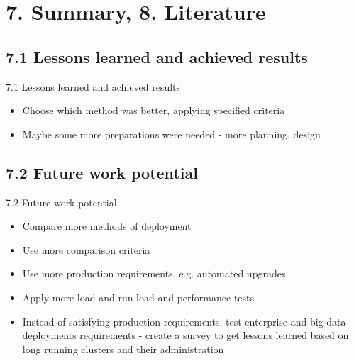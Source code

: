 \documentclass{beamer}
\begin{document}
\section{7. Summary, 8. Literature}
\subsection{7.1 Lessons learned and achieved results}
\begin{frame}{7.1 Lessons learned and achieved results}%
\begin{itemize}
	\item Choose which method was better, applying specified criteria 
	\item Maybe some more preparations were needed - more planning, design
\end{itemize}
\end{frame}
\subsection{7.2 Future work potential}
\begin{frame}{7.2 Future work potential}%
\begin{itemize}
	\item Compare more methods of deployment
	\item Use more comparison criteria 
	\item Use more production requirements, e.g. automated upgrades
	\item Apply more load and run load and performance tests
	\item Instead of satisfying production requirements, test enterprise and big data deployments requirements - create a survey to get lessons learned based on long running clusters and their administration
\end{itemize}
\end{frame}
\end{document}

